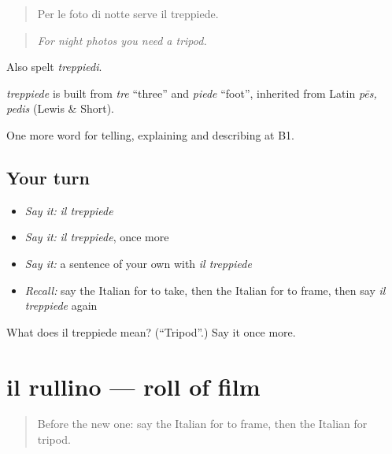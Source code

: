 \begin{quote}
Per le foto di notte serve il treppiede.
\end{quote}

\begin{quote}
\emph{For night photos you need a tripod.}
\end{quote}

Also spelt \emph{treppiedi}.

\begin{cousinweb}
\emph{treppiede} is built from \emph{tre} \textquotedblleft{}three\textquotedblright{} and \emph{piede} \textquotedblleft{}foot\textquotedblright{}, inherited from Latin \emph{pēs, pedis} (Lewis \& Short).
\end{cousinweb}

\begin{grammarlens}[title={What you've built}]
One more word for telling, explaining and describing at B1.
\end{grammarlens}

\subsection*{Your turn}
\begin{itemize}
\raggedright
  \item \emph{Say it:} \emph{il treppiede}
  \item \emph{Say it:} \emph{il treppiede}, once more
  \item \emph{Say it:} a sentence of your own with \emph{il treppiede}
  \item \emph{Recall:} say the Italian for to take, then the Italian for to frame, then say \emph{il treppiede} again
\end{itemize}

\begin{tcolorbox}[breakable,colback=teal!4,colframe=teal!35!black,title={Before you move on}]
What does il treppiede mean? (\textquotedblleft{}Tripod\textquotedblright{}.) Say it once more.
\end{tcolorbox}
\section[il rullino]{il rullino — roll of film}

\label{lesson:IT-C506-rullino}



\begin{quote}
Before the new one: say the Italian for to frame, then the Italian for tripod.
\end{quote}

